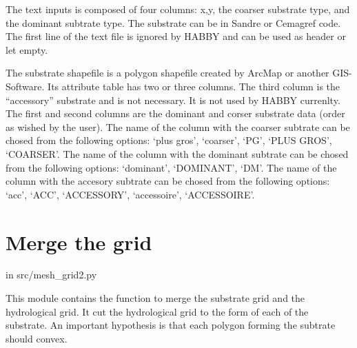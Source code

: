 \documentclass[letterpaper,10pt,english]{sphinxmanual}
\begin{document}
The text inputs is composed of four columns: x,y, the coarser substrate type, and the dominant subtrate type. The substrate can be in Sandre or Cemagref code. The first line of the text file is ignored by HABBY and can be used as header or let empty.

The substrate shapefile is a polygon shapefile created by ArcMap or another GIS-Software. Its attribute table has two or three columns. The third column is the ``accessory'' substrate and is not necessary. It is not used by HABBY currenlty.
The first and second columns are the dominant and corser substrate data (order as wished by the user). The name of the column with the coarser subtrate can be chosed from the following options: `plus gros', `coarser', `PG', `PLUS GROS', `COARSER'. The name of the column with the dominant subtrate can be chosed from the following options: `dominant', `DOMINANT', `DM'. The name of the column with the accesory subtrate can be chosed from the following options: `acc', `ACC', `ACCESSORY', `accessoire', `ACCESSOIRE'.


\section{Merge the grid}
\label{\detokenize{index:merge-the-grid}}
in src/mesh\_grid2.py

This module contains the function to merge the substrate grid and the hydrological grid.
It cut the hydrological grid to the form of each of the substrate. An important hypothesis
is that each polygon forming the subtrate should convex.
\label{\detokenize{index:module-src.mesh_grid2}}
\end{document}
